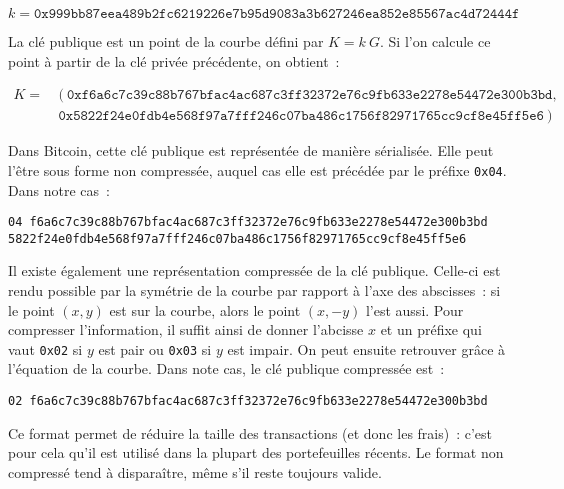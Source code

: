 { \footnotesize
\[
k = \mathtt{0x999bb87eea489b2fc6219226e7b95d9083a3b627246ea852e85567ac4d72444f}
\]
}



La clé publique est un point de la courbe défini par $K = k~G$. Si l'on calcule ce point à partir de la clé privée précédente, on obtient~:

{ \footnotesize
\begin{align*}
K = &~(~\mathtt{0xf6a6c7c39c88b767bfac4ac687c3ff32372e76c9fb633e2278e54472e300b3bd}, \\
    &~\mathtt{0x5822f24e0fdb4e568f97a7fff246c07ba486c1756f82971765cc9cf8e45ff5e6}~)
\end{align*}
}

Dans Bitcoin, cette clé publique est représentée de manière sérialisée. Elle peut l'être sous forme non compressée, auquel cas elle est précédée par le préfixe \verb?0x04?. Dans notre cas~: 

\begin{Verbatim}[fontsize=\footnotesize]
04 f6a6c7c39c88b767bfac4ac687c3ff32372e76c9fb633e2278e54472e300b3bd
5822f24e0fdb4e568f97a7fff246c07ba486c1756f82971765cc9cf8e45ff5e6
\end{Verbatim}

Il existe également une représentation compressée de la clé publique. Celle-ci est rendu possible par la symétrie de la courbe par rapport à l'axe des abscisses~: si le point $(x, y)$ est sur la courbe, alors le point $(x, - y)$ l'est aussi. Pour compresser l'information, il suffit ainsi de donner l'abcisse $x$ et un préfixe qui vaut \verb?0x02? si $y$ est pair ou \verb?0x03? si $y$ est impair. On peut ensuite retrouver grâce à l'équation de la courbe. Dans note cas, le clé publique compressée est~:

\begin{Verbatim}[fontsize=\footnotesize]
02 f6a6c7c39c88b767bfac4ac687c3ff32372e76c9fb633e2278e54472e300b3bd
\end{Verbatim}

Ce format permet de réduire la taille des transactions (et donc les frais)~: c'est pour cela qu'il est utilisé dans la plupart des portefeuilles récents. Le format non compressé tend à disparaître, même s'il reste toujours valide.


